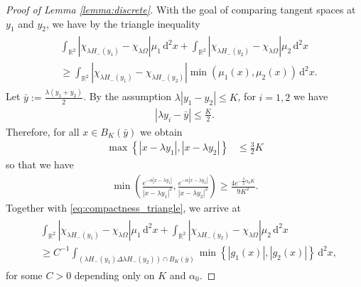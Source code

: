 \documentclass[11pt]{article}
\numberwithin{statement}{section}
\numberwithin{equation}{section}
\theoremstyle{remark}
\newcommand{\R}{\mathbb R} 				%
\newcommand{\intd}{\, \mathrm{d}} 				%
\begin{document}
\begin{proof}[Proof of Lemma \ref{lemma:discrete}]
      With the goal of comparing tangent spaces at $y_1$ and $y_2$, we
      have by the triangle inequality
	\begin{align}\label{eq:compactness_triangle}
	   \begin{split}
             & \int_{\R^2} \left| \chi_{\lambda H_-\left(y_1
                 \right)} - \chi_{\lambda \Omega} \right| \mu_1
             \intd^2 x + \int_{\R^2} \left| \chi_{\lambda H_-(y_2)}
               -
               \chi_{\lambda \Omega} \right| \mu_2 \intd^2 x\\
             & \geq \int_{\R^2} \left| \chi_{\lambda
                   H_-\left(y_1\right)} - \chi_{\lambda
                   H_-(y_2)} \right|
             \min\left(\mu_1(x),\mu_2\left(x\right)\right) \intd^2 x.
	  \end{split}
	\end{align}
	Let $\bar y := \frac{\lambda (y_1 + y_2)}{2}$.  By the
        assumption $\lambda |y_1 -y_2| \leq K$, for $i=1,2$ we
        have
	\begin{align}\label{eq:distance_blowup_points}
          |\lambda y_i - \bar y| \leq \frac{K}{2}.
	\end{align}
	Therefore, for all $x \in B_{ K}(\bar y)$ we obtain
	\begin{align}
          \max\left\{ | x- \lambda  y_1| , |x-\lambda y_2|  \right\}
          &            \leq \frac{3}{2}  K 
	\end{align}
	so that we have
	\begin{align}\label{eq:compactness_kernel_bound}
          \min\left(\frac{e^{-\alpha|x-\lambda
          y_1|}}{|x-\lambda y_1|^2},  \frac{e^{-\alpha|x-\lambda
          y_2|}}{|x-\lambda y_2|^2} \right) \geq \frac{4 e^{-\frac32
          \alpha_0 K}}{ 9 K^2}. 
	\end{align} 
	Together with \eqref{eq:compactness_triangle}, we arrive at
	\begin{align}\label{eq:compactness_terrible}
	   \begin{split}
             & \int_{\R^2} \left| \chi_{\lambda H_-\left(y_1 \right)}
               - \chi_{\lambda \Omega} \right| \mu_1 \intd^2 x +
             \int_{\R^2} \left| \chi_{\lambda H_-(y_2)} -
               \chi_{\lambda \Omega} \right| \mu_2 \intd^2 x\\
             & \geq C^{-1} \int_{\left(  \lambda H_- \left(y_1
                   \right) \Delta \lambda H_-(y_2) \right) \cap B_{
                 K}(\bar y)} \min\left\{|g_1(x)|,|g_2(x)| \right\}
             \intd^2 x,
	  \end{split}
	\end{align}
        for some $C > 0$ depending only on $K$ and $\alpha_0$.
	

\end{proof}
\end{document}
